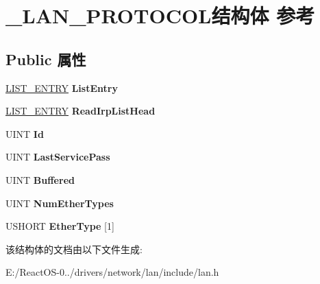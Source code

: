 \hypertarget{struct___l_a_n___p_r_o_t_o_c_o_l}{}\section{\+\_\+\+L\+A\+N\+\_\+\+P\+R\+O\+T\+O\+C\+O\+L结构体 参考}
\label{struct___l_a_n___p_r_o_t_o_c_o_l}
\subsection*{Public 属性}
\begin{DoxyCompactItemize}
\item 
\mbox{\label{struct___l_a_n___p_r_o_t_o_c_o_l_ae9c6c345e02d0cc4877a18631529f5ba}} 
\hyperlink{struct___l_i_s_t___e_n_t_r_y}{L\+I\+S\+T\+\_\+\+E\+N\+T\+RY} {\bfseries List\+Entry}
\item 
\mbox{\label{struct___l_a_n___p_r_o_t_o_c_o_l_a34f9774df3a86daeff5acdd8721b3031}} 
\hyperlink{struct___l_i_s_t___e_n_t_r_y}{L\+I\+S\+T\+\_\+\+E\+N\+T\+RY} {\bfseries Read\+Irp\+List\+Head}
\item 
\mbox{\label{struct___l_a_n___p_r_o_t_o_c_o_l_a356bea2b9c1e4a7301bde8cfeda5125a}} 
U\+I\+NT {\bfseries Id}
\item 
\mbox{\label{struct___l_a_n___p_r_o_t_o_c_o_l_aa3ecd4d50b8c691f470966f47214c544}} 
U\+I\+NT {\bfseries Last\+Service\+Pass}
\item 
\mbox{\label{struct___l_a_n___p_r_o_t_o_c_o_l_a17aa78fa02d9233191949bfa0b05f5d9}} 
U\+I\+NT {\bfseries Buffered}
\item 
\mbox{\label{struct___l_a_n___p_r_o_t_o_c_o_l_a9e63983c2e56fbc5b1af84bd88081ce1}} 
U\+I\+NT {\bfseries Num\+Ether\+Types}
\item 
\mbox{\label{struct___l_a_n___p_r_o_t_o_c_o_l_aca32f991f1761d77ad753dafc83101c5}} 
U\+S\+H\+O\+RT {\bfseries Ether\+Type} \mbox{[}1\mbox{]}
\end{DoxyCompactItemize}


该结构体的文档由以下文件生成\+:\begin{DoxyCompactItemize}
\item 
E\+:/\+React\+O\+S-\/0../drivers/network/lan/include/lan.\+h\end{DoxyCompactItemize}
